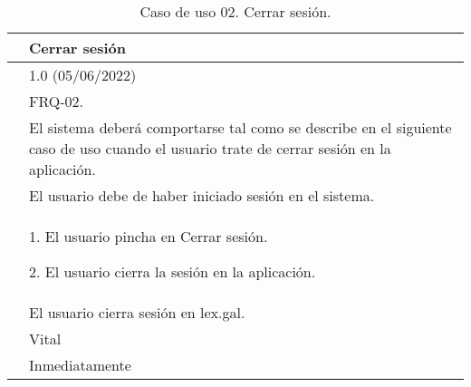 \begin{table}[H]
\begin{center}
\begin{tabular}{|p{3cm}|p{10cm}|} \hline
\centering {\bf UC-02} & Cerrar sesión  \\ \hline\hline
\centering {\bf Versión} & 1.0 (05/06/2022) \\ \hline
\centering {\bf Dependencias} &  FRQ-02. \\ \hline
\centering {\bf Descripción} &  El sistema deberá comportarse tal como se describe en el siguiente caso de uso cuando el usuario trate de cerrar sesión en la aplicación. \\ \hline
\centering {\bf Precondición} &  El usuario debe de haber iniciado sesión en el sistema. \\ \hline
\centering {\bf Secuencia normal} &  
1. El usuario pincha en Cerrar sesión.

2. El usuario cierra la sesión en la aplicación.
\\ \hline
\centering {\bf Postcondición} &  El usuario cierra sesión en lex.gal. \\ \hline
\centering {\bf Importancia} & Vital \\ \hline
\centering {\bf Urgencia} & Inmediatamente \\ \hline
\end{tabular}
\caption{Caso de uso 02. Cerrar sesión.}
\label{enlaceUC2}
\end{center}
\end{table}

